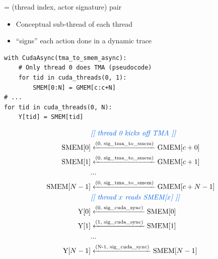 \begin{minipage}[t]{0.48\textwidth}\fixminipage
{} = (thread index, actor signature) pair
\begin{itemize}
  \item Conceptual sub-thread of each thread
  \item ``signs'' each action done in a dynamic trace
\end{itemize}
\vspace{2mm}
\begin{verbatim}
with CudaAsync(tma_to_smem_async):
    # Only thread 0 does TMA (pseudocode)
    for tid in cuda_threads(0, 1):
        SMEM[0:N] = GMEM[c:c+N]
# ...
for tid in cuda_threads(0, N):
    Y[tid] = SMEM[tid]
\end{verbatim}
\vspace{-4mm}
\begin{align*}
    & {\color{blueBoxFg}\textit{[[ thread 0 kicks off TMA ]]}} \\
    \text{SMEM[$0$]} & \xleftarrow{\text{(0, sig\_tma\_to\_smem)}} \text{GMEM[$c+0$]} \\
    \text{SMEM[$1$]} & \xleftarrow{\text{(0, sig\_tma\_to\_smem)}} \text{GMEM[$c+1$]} \\
    & ... \\
    \text{SMEM[$N-1$]} & \xleftarrow{\text{(0, sig\_tma\_to\_smem)}} \text{GMEM[$c+N-1$]} \\
    & {\color{blueBoxFg}\textit{[[ thread $x$ reads SMEM[$x$] ]]}} \\
    \text{Y[$0$]} & \xleftarrow{\text{(0, sig\_cuda\_sync)}} \text{SMEM[$0$]} \\
    \text{Y[$1$]} & \xleftarrow{\text{(1, sig\_cuda\_sync)}} \text{SMEM[$1$]} \\
    & ... \\
    \text{Y[$N-1$]} & \xleftarrow{\text{(N-1, sig\_cuda\_sync)}} \text{SMEM[$N-1$]} \\
\end{align*}
\end{minipage}
\newpage
{}

